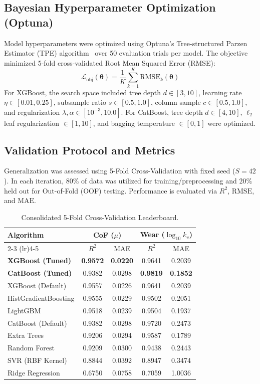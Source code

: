 \documentclass[10pt,twocolumn,a4paper]{article}
\begin{document}
\subsection{Bayesian Hyperparameter Optimization (Optuna)}
Model hyperparameters were optimized using Optuna's Tree-structured Parzen Estimator (TPE) algorithm~\cite{akiba2019optuna} over 50 evaluation trials per model. The objective minimized 5-fold cross-validated Root Mean Squared Error (RMSE):
\begin{equation}
    \mathcal{L}_{\text{obj}}(\boldsymbol{\theta}) = \frac{1}{K} \sum_{k=1}^K \text{RMSE}_k(\boldsymbol{\theta})
\end{equation}
For XGBoost, the search space included tree depth $d \in [3, 10]$, learning rate $\eta \in [0.01, 0.25]$, subsample ratio $s \in [0.5, 1.0]$, column sample $c \in [0.5, 1.0]$, and regularization $\lambda, \alpha \in [10^{-3}, 10.0]$. For CatBoost, tree depth $d \in [4, 10]$, $\ell_2$ leaf regularization $\in [1, 10]$, and bagging temperature $\in [0, 1]$ were optimized.

\subsection{Validation Protocol and Metrics}
Generalization was assessed using 5-Fold Cross-Validation with fixed seed ($S = 42$). In each iteration, $80\%$ of data was utilized for training/preprocessing and $20\%$ held out for Out-of-Fold (OOF) testing. Performance is evaluated via $R^2$, $\text{RMSE}$, and $\text{MAE}$.

\begin{table}[t]
\centering
\caption{Consolidated 5-Fold Cross-Validation Leaderboard.}
\label{tab:leaderboard}
\scriptsize
\begin{tabular}{lcccc}
\toprule
\textbf{Algorithm} & \multicolumn{2}{c}{\textbf{CoF ($\mu$)}} & \multicolumn{2}{c}{\textbf{Wear ($\log_{10} k_v$)}} \\
\cmidrule(lr){2-3} \cmidrule(lr){4-5}
& $R^2$ & MAE & $R^2$ & MAE \\
\midrule
\textbf{XGBoost (Tuned)} & \textbf{0.9572} & \textbf{0.0220} & 0.9641 & 0.2039 \\
\textbf{CatBoost (Tuned)} & 0.9382 & 0.0298 & \textbf{0.9819} & \textbf{0.1852} \\
XGBoost (Default) & 0.9557 & 0.0226 & 0.9641 & 0.2039 \\
HistGradientBoosting & 0.9555 & 0.0229 & 0.9502 & 0.2051 \\
LightGBM & 0.9518 & 0.0239 & 0.9504 & 0.1937 \\
CatBoost (Default) & 0.9382 & 0.0298 & 0.9720 & 0.2473 \\
Extra Trees & 0.9206 & 0.0294 & 0.9587 & 0.1789 \\
Random Forest & 0.9209 & 0.0300 & 0.9438 & 0.2443 \\
SVR (RBF Kernel) & 0.8844 & 0.0392 & 0.8947 & 0.3474 \\
Ridge Regression & 0.6750 & 0.0758 & 0.7059 & 1.0036 \\
\bottomrule
\end{tabular}
\end{table}
\end{document}
